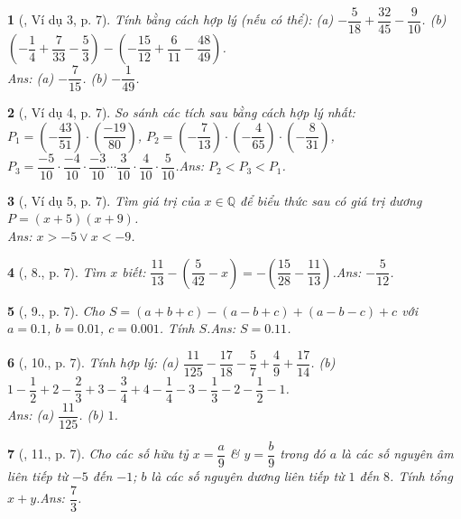 \documentclass{article}
\newtheorem{baitoan}{}
\begin{document}
\begin{baitoan}[\cite{Tuyen_Toan_7}, Ví dụ 3, p. 7]
	Tính bằng cách hợp lý (nếu có thể): (a) $-\dfrac{5}{18} + \dfrac{32}{45} - \dfrac{9}{10}$. (b) $\left(-\dfrac{1}{4} + \dfrac{7}{33} - \dfrac{5}{3}\right) - \left(-\dfrac{15}{12} + \dfrac{6}{11} - \dfrac{48}{49}\right)$.\\\mbox{}\hfill{\sf Ans: (a) $-\dfrac{7}{15}$. (b) $-\dfrac{1}{49}$.}
\end{baitoan}

\begin{baitoan}[\cite{Tuyen_Toan_7}, Ví dụ 4, p. 7]
	So sánh các tích sau bằng cách hợp lý nhất: $P_1 = \left(-\dfrac{43}{51}\right)\cdot\left(\dfrac{-19}{80}\right)$, $P_2 = \left(-\dfrac{7}{13}\right)\cdot\left(-\dfrac{4}{65}\right)\cdot\left(-\dfrac{8}{31}\right)$, $P_3 = \dfrac{-5}{10}\cdot\dfrac{-4}{10}\cdot\dfrac{-3}{10}\cdots\dfrac{3}{10}\cdot\dfrac{4}{10}\cdot\dfrac{5}{10}$.\hfill{\sf Ans: $P_2 < P_3 < P_1$.}
\end{baitoan}

\begin{baitoan}[\cite{Tuyen_Toan_7}, Ví dụ 5, p. 7]
	Tìm giá trị của $x\in\mathbb{Q}$ để biểu thức sau có giá trị dương  $P = (x + 5)(x + 9)$.\\\mbox{}\hfill{\sf Ans: $x > -5\lor x < -9$.}
\end{baitoan}

\begin{baitoan}[\cite{Tuyen_Toan_7}, 8., p. 7]
	Tìm $x$ biết: $\dfrac{11}{13} - \left(\dfrac{5}{42} - x\right) = -\left(\dfrac{15}{28} - \dfrac{11}{13}\right)$.\hfill{\sf Ans: $-\dfrac{5}{12}$.}
\end{baitoan}

\begin{baitoan}[\cite{Tuyen_Toan_7}, 9., p. 7]
	Cho $S = (a + b + c) - (a - b + c) + (a - b - c) + c$ với $a = 0.1$, $b = 0.01$, $c = 0.001$. Tính $S$.\hfill{\sf Ans: $S = 0.11$.}
\end{baitoan}

\begin{baitoan}[\cite{Tuyen_Toan_7}, 10., p. 7]
	Tính hợp lý: (a) $\dfrac{11}{125} - \dfrac{17}{18} - \dfrac{5}{7} + \dfrac{4}{9} + \dfrac{17}{14}$. (b) $1 - \dfrac{1}{2} + 2 - \dfrac{2}{3} + 3 - \dfrac{3}{4} + 4 - \dfrac{1}{4} - 3 - \dfrac{1}{3} - 2 - \dfrac{1}{2} - 1$.\\\mbox{}\hfill{\sf Ans: (a) $\dfrac{11}{125}$. (b) $1$.}
\end{baitoan}

\begin{baitoan}[\cite{Tuyen_Toan_7}, 11., p. 7]
	Cho các số hữu tỷ $x = \dfrac{a}{9}$ \& $y = \dfrac{b}{9}$ trong đó $a$ là các số nguyên âm liên tiếp từ $-5$ đến $-1$; $b$ là các số nguyên dương liên tiếp từ $1$ đến $8$. Tính tổng $x + y$.\hfill{\sf Ans: $\dfrac{7}{3}$.}
\end{baitoan}
\end{document}

